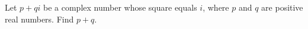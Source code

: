 Let $p+qi$ be a complex number whose square equals $i$, where $p$ and $q$ are positive real numbers. Find $p+q$.
